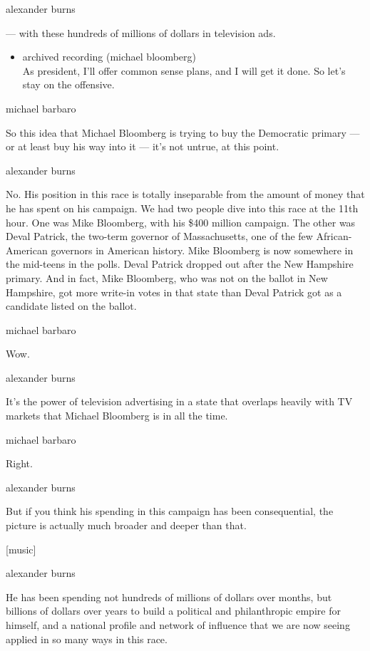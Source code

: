 alexander burns

--- with these hundreds of millions of dollars in television ads.

\begin{itemize}
\tightlist
\item
  archived recording (michael bloomberg)\\
  As president, I'll offer common sense plans, and I will get it done.
  So let's stay on the offensive.
\end{itemize}

michael barbaro

So this idea that Michael Bloomberg is trying to buy the Democratic
primary --- or at least buy his way into it --- it's not untrue, at this
point.

alexander burns

No. His position in this race is totally inseparable from the amount of
money that he has spent on his campaign. We had two people dive into
this race at the 11th hour. One was Mike Bloomberg, with his \$400
million campaign. The other was Deval Patrick, the two-term governor of
Massachusetts, one of the few African-American governors in American
history. Mike Bloomberg is now somewhere in the mid-teens in the polls.
Deval Patrick dropped out after the New Hampshire primary. And in fact,
Mike Bloomberg, who was not on the ballot in New Hampshire, got more
write-in votes in that state than Deval Patrick got as a candidate
listed on the ballot.

michael barbaro

Wow.

alexander burns

It's the power of television advertising in a state that overlaps
heavily with TV markets that Michael Bloomberg is in all the time.

michael barbaro

Right.

alexander burns

But if you think his spending in this campaign has been consequential,
the picture is actually much broader and deeper than that.

{[}music{]}

alexander burns

He has been spending not hundreds of millions of dollars over months,
but billions of dollars over years to build a political and
philanthropic empire for himself, and a national profile and network of
influence that we are now seeing applied in so many ways in this race.

